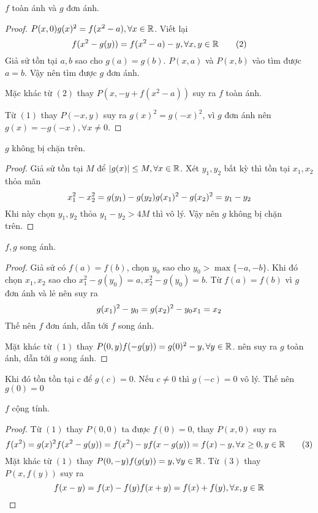 \documentclass[11pt]{scrartcl}
\begin{document}
\begin{itemize}[label=, leftmargin=0em, itemsep=0.5em]
\begin{sol}
        $f$ toàn ánh và $g$ đơn ánh.
        \begin{proof}
            $P(x,0) \ra g(x)^2 = f(x^2 - a), \xr$. Viết lại 
        \[
            f(x^2 - g(y)) = f(x^2 - a) - y, \forall x,y \in \mathbb{R}\tag{2}
        \]
        Giả sử tồn tại $a,b$ sao cho $g(a) = g(b)$. $P(x,a)$ và $P(x,b)$ vào tìm được $a = b$. Vậy nên tìm được $g$ đơn ánh. 

        Mặc khác từ $(2)$ thay $P(x,-y + f(x^2 - a))$ suy ra $f$ toàn ánh. 

        Từ $(1)$ thay $P(-x,y)$ suy ra $g(x)^2 = g(-x)^2$, vì $g$ đơn ánh nên $g(x) = -g(-x),\forall x \neq 0$.
        \end{proof}
        
         $g$ không bị chặn trên. 
        \begin{proof}
            Giả sử tồn tại $M$ để $|g(x)| \leq M, \forall x\in \mathbb{R}$. Xét $y_1,y_2$ bất kỳ thì tồn tại $x_1,x_2$ thỏa mãn 
            \[
                x_1^2 - x_2^2 = g(y_1) - g(y_2) \ra g(x_1)^2 - g(x_2)^2 = y_1 - y_2
            \]
            Khi này chọn $y_1,y_2$ thỏa $y_1 - y_2 > 4M$ thì vô lý. Vậy nên $g$ không bị chặn trên.
        \end{proof}
         $f,g$ song ánh. 
        \begin{proof}
            Giả sử có $f(a) = f(b)$, chọn $y_0$ sao cho $y_0 > \max\{-a,-b\}$. Khi đó chọn $x_1,x_2$ sao cho $x_1^2 - g(y_0) = a, x_2^2 - g(y_0) = b$. Từ $f(a) = f(b)$ vì $g$ đơn ánh và lẻ nên suy ra 
            \[
                g(x_1)^2 - y_0 = g(x_2)^2 - y_0 \ra x_1 = x_2
            \]
            Thế nên $f$ đơn ánh, dẫn tới $f$ song ánh.

            Mặt khác từ $(1)$ thay $P(0,y) \ra f(-g(y)) = g(0)^2 - y, \yr$. nên suy ra $g$ toàn ánh, dẫn tới $g$ song ánh.
        \end{proof}
        Khi đó tồn tồn tại $c$ để $g(c) = 0$. Nếu $c \neq 0$ thì $g(-c) =0$ vô lý. Thế nên $g(0) = 0$
        
         $f$ cộng tính.
        \begin{proof}
            Từ $(1)$ thay $P(0,0)$ ta được $f(0) = 0$, thay $P(x,0)$ suy ra 
            \[
                f(x^2) = g(x)^2 \ra f(x^2 - g(y)) = f(x^2) - y  \ra f(x - g(y)) = f(x) - y,\forall x \geq 0, y \in \bb{R} \tag{3}
            \]    
            Mặt khác từ $(1)$ thay $P(0,-y) \ra f(g(y)) = y, \yr $. Từ $(3)$ thay $P(x,f(y))$ suy ra 
            \[
                f(x - y) = f(x) - f(y) \ra f(x + y) = f(x) + f(y), \xyr
            \]
            

\end{proof}
\end{sol}
\end{itemize}
\end{document}
